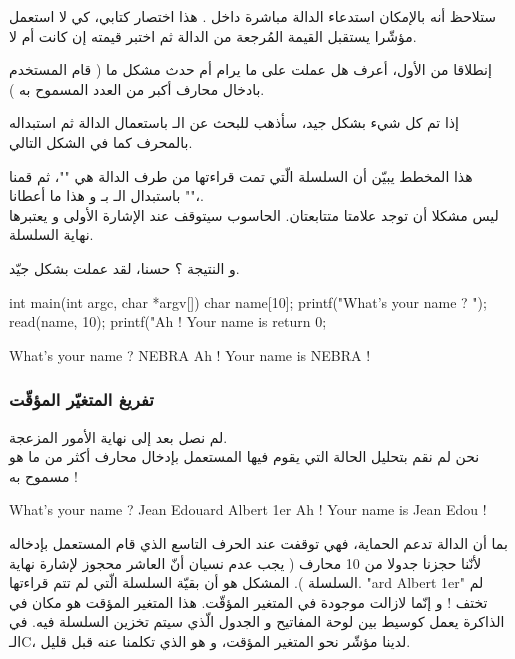 ستلاحظ أنه بالإمكان استدعاء الدالة
مباشرة داخل
.
هذا اختصار كتابي، كي لا استعمل مؤشّرا يستقبل القيمة المُرجعة من الدالة ثم اختبر قيمته إن كانت
أم لا.

إنطلاقا من
الأول، أعرف هل
عملت على ما يرام أم حدث مشكل ما ( قام المستخدم بادخال محارف أكبر من العدد المسموح به ).

إذا تم كل شيء بشكل جيد، سأذهب للبحث عن الـ
باستعمال الدالة
ثم استبداله بالمحرف
كما في الشكل التالي.


هذا المخطط يبيّن أن السلسلة الّتي تمت قراءتها من طرف الدالة
هي
""،
ثم قمنا باستبدال الـ
بـ
و هذا ما أعطانا
""،.\\
ليس مشكلا أن توجد علامتا
متتابعتان. الحاسوب سيتوقف عند الإشارة الأولى و يعتبرها نهاية السلسلة.

و النتيجة ؟ حسنا، لقد عملت بشكل جيّد.

\begin{Csource}
  int main(int argc, char *argv[])
  {
  	char name[10];
  	printf("What's your name ? ");
  	read(name, 10);
  	printf("Ah ! Your name is %
  	return 0;
  }
\end{Csource}

\begin{Console}
What's your name ? NEBRA
Ah ! Your name is NEBRA !
\end{Console}

\subsubsection{تفريغ المتغيّر المؤقّت}

لم نصل بعد إلى نهاية الأمور المزعجة.\\
نحن لم نقم بتحليل الحالة التي يقوم فيها المستعمل بإدخال محارف أكثر من ما هو مسموح به !

\begin{Console}
What's your name ? Jean Edouard Albert 1er
Ah ! Your name is Jean Edou !
\end{Console}

بما أن الدالة
تدعم الحماية، فهي توقفت عند الحرف التاسع الذي قام المستعمل بإدخاله لأنّنا حجزنا جدولا من 10 محارف ( يجب عدم نسيان أنّ العاشر محجوز لإشارة نهاية السلسلة ).
المشكل هو أن بقيّة السلسلة الّتي لم تتم قراءتها.
"\textenglish{ard Albert 1er}"
لم تختف ! و إنّما لازالت موجودة في المتغير المؤقّت. هذا المتغير المؤقت هو مكان في الذاكرة يعمل كوسيط بين لوحة المفاتيح و الجدول الّذي سيتم تخزين السلسلة فيه. في الـ\textenglish{C}،
لدينا مؤشّر نحو المتغير المؤقت، و هو
الذي تكلمنا عنه قبل قليل.

